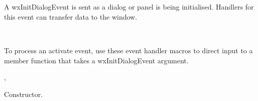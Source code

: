 \section{}\label{wxinitdialogevent}

A wxInitDialogEvent is sent as a dialog or panel is being initialised.
Handlers for this event can transfer data to the window.


\\


To process an activate event, use these event handler macros to direct input to a member
function that takes a wxInitDialogEvent argument.

\twocolwidtha{7cm}
\begin{twocollist}\itemsep=0pt
\end{twocollist}%


,\rtfsp
{}




Constructor.


